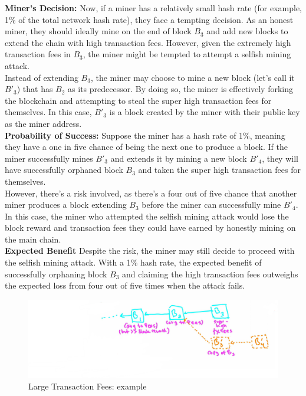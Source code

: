\noindent
\textbf{Miner's Decision: }Now, if a miner has a relatively small hash rate (for example, 1\% of the total network hash rate), they face a tempting decision. As an honest miner, they should ideally mine on the end of block $B_3$ and add new blocks to extend the chain with high transaction fees. However, given the extremely high transaction fees in $B_3$, the miner might be tempted to attempt a selfish mining attack.\\
Instead of extending $B_3$, the miner may choose to mine a new block (let's call it $B'_3$) that has $B_2$ as its predecessor. By doing so, the miner is effectively forking the blockchain and attempting to steal the super high transaction fees for themselves. In this case, $B'_3$ is a block created by the miner with their public key as the miner address.\\

\noindent
\textbf{Probability of Success: }Suppose the miner has a hash rate of 1\%, meaning they have a one in five chance of being the next one to produce a block. If the miner successfully mines $B'_3$ and extends it by mining a new block $B'_4$, they will have successfully orphaned block $B_3$ and taken the super high transaction fees for themselves.\\
However, there's a risk involved, as there's a four out of five chance that another miner produces a block extending $B_3$ before the miner can successfully mine $B'_4$. In this case, the miner who attempted the selfish mining attack would lose the block reward and transaction fees they could have earned by honestly mining on the main chain.\\

\noindent
\textbf{Expected Benefit}
Despite the risk, the miner may still decide to proceed with the selfish mining attack. With a 1\% hash rate, the expected benefit of successfully orphaning block $B_3$ and claiming the high transaction fees outweighs the expected loss from four out of five times when the attack fails.\\

\begin{figure}[h]
    \centering
    \includegraphics[scale = 0.8]{figures/f49.png}
    \caption{Large Transaction Fees: example}
    \label{fig:mesh1}
\end{figure}


